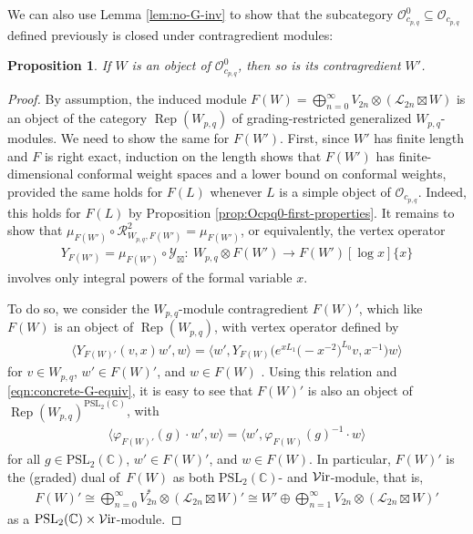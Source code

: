 \documentclass[pdftex]{sigma}
\numberwithin{equation}{section}
\newtheorem{Proposition}[Theorem]{Proposition}
\theoremstyle{definition}
\begin{document}
We can also use Lemma \ref{lem:no-G-inv} to show that the subcategory $\mathcal{O}_{c_{p,q}}^0\subseteq\mathcal{O}_{c_{p,q}}$ defined previously is closed under contragredient modules:
\begin{Proposition}\label{prop:Ocpq0-contragredients}
 If $W$ is an object of $\mathcal{O}_{c_{p,q}}^0$, then so is its contragredient $W'$.
\end{Proposition}
\begin{proof}
By assumption, the induced module $F(W)=\bigoplus_{n=0}^\infty V_{2n}\otimes(\mathcal{L}_{2n}\boxtimes W)$ is an object of the category $\operatorname{Rep}(W_{p,q})$ of grading-restricted generalized $W_{p,q}$-modules. We need to show the same for $F(W')$. First, since $W'$ has finite length and $F$ is right exact, induction on the length shows that $F(W')$ has finite-dimensional conformal weight spaces and a lower bound on conformal weights, provided the same holds for $F(L)$ whenever $L$ is a simple object of $\mathcal{O}_{c_{p,q}}$. Indeed, this holds for $F(L)$ by Proposition \ref{prop:Ocpq0-first-properties}. It remains to show that $\mu_{F(W')}\circ\mathcal{R}_{W_{p,q},F(W')}^2=\mu_{F(W')}$, or equivalently, the vertex operator
\begin{gather*}
Y_{F(W')} =\mu_{F(W')}\circ\mathcal{Y}_\boxtimes \colon\ W_{p,q}\otimes F(W')\longrightarrow F(W')[\log x]\lbrace x\rbrace
\end{gather*}
involves only integral powers of the formal variable $x$.






 To do so, we consider the $W_{p,q}$-module contragredient $F(W)'$, which like $F(W)$ is an object of $\operatorname{Rep}(W_{p,q})$, with vertex operator defined by
\begin{gather*}
\langle Y_{F(W)'}(v,x)w', w\rangle =\big\langle w', Y_{F(W)}\bigl(e^{xL_1}\bigl(-x^{-2}\bigr)^{L_0} v, x^{-1}\bigr)w\big\rangle
\end{gather*}
for $v\in W_{p,q}$, $w'\in F(W)'$, and $w\in F(W)$ \cite{FHL}. Using this relation and \eqref{eqn:concrete-G-equiv}, it is easy to see that $F(W)'$ is also an object of $\operatorname{Rep}(W_{p,q})^{\mathrm{PSL}_2(\mathbb{C})}$, with
\begin{gather*}
\langle \varphi_{F(W)'}(g)\cdot w', w\rangle = \big\langle w',\varphi_{F(W)}(g)^{-1}\cdot w\big\rangle
\end{gather*}
for all $g\in \mathrm{PSL}_2(\mathbb{C})$, $w'\in F(W)'$, and $w\in F(W)$. In particular, $F(W)'$ is the (graded) dual of~$F(W)$ as both $\mathrm{PSL}_2(\mathbb{C})$- and $\mathcal{V}{\rm ir}$-module, that is,{\samepage
\begin{gather}\label{eqn:F(W)'-decomp}
F(W)'\cong\bigoplus_{n=0}^\infty V_{2n}^*\otimes(\mathcal{L}_{2n}\boxtimes W)'\cong W'\oplus\bigoplus_{n=1}^\infty V_{2n}\otimes(\mathcal{L}_{2n}\boxtimes W)'
\end{gather}
as a $\mathrm{PSL}_2(\mathbb{C})\times\mathcal{V}{\rm ir}$-module.}


\end{proof}
\end{document}
